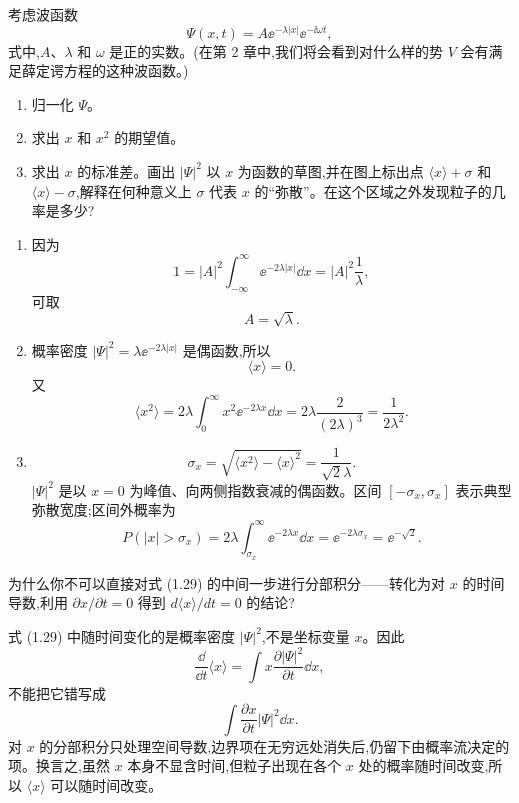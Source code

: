 \begin{question}
考虑波函数
\[
\Psi(x,t)=A \ee^{-\lambda |x|} \ee^{-\ii\omega t},
\]
式中,$A$、$\lambda$ 和 $\omega$ 是正的实数。(在第 2 章中,我们将会看到对什么样的势 $V$ 会有满足薛定谔方程的这种波函数。)
\begin{enumerate}
\item 归一化 $\Psi$。
\item 求出 $x$ 和 $x^2$ 的期望值。
\item 求出 $x$ 的标准差。画出 $|\Psi|^2$ 以 $x$ 为函数的草图,并在图上标出点 $\langle x\rangle+\sigma$ 和 $\langle x\rangle-\sigma$,解释在何种意义上 $\sigma$ 代表 $x$ 的“弥散”。在这个区域之外发现粒子的几率是多少?
\end{enumerate}
\end{question}
\begin{solution}
\begin{enumerate}
\item 因为
\[
1=|A|^2\int_{-\infty}^{\infty}\ee^{-2\lambda |x|}\dd x
=|A|^2\frac{1}{\lambda},
\]
可取
\[
A=\sqrt{\lambda}.
\]
\item 概率密度 $|\Psi|^2=\lambda \ee^{-2\lambda |x|}$ 是偶函数,所以
\[
\langle x\rangle=0.
\]
又
\[
\langle x^2\rangle=2\lambda\int_0^\infty x^2\ee^{-2\lambda x}\dd x
=2\lambda\frac{2}{(2\lambda)^3}=\frac{1}{2\lambda^2}.
\]
\item
\[
\sigma_x=\sqrt{\langle x^2\rangle-\langle x\rangle^2}=\frac{1}{\sqrt2\lambda}.
\]
$|\Psi|^2$ 是以 $x=0$ 为峰值、向两侧指数衰减的偶函数。区间
$[-\sigma_x,\sigma_x]$ 表示典型弥散宽度;区间外概率为
\[
P(|x|>\sigma_x)=2\lambda\int_{\sigma_x}^{\infty}\ee^{-2\lambda x}\dd x
=\ee^{-2\lambda\sigma_x}=\ee^{-\sqrt2}.
\]
\end{enumerate}
\end{solution}

\begin{question}
为什么你不可以直接对式 (1.29) 的中间一步进行分部积分——转化为对 $x$ 的时间导数,利用 $\partial x/\partial t=0$ 得到 $d\langle x\rangle/dt=0$ 的结论?

\par\smallskip
{}

\end{question}
\begin{solution}
式 (1.29) 中随时间变化的是概率密度 $|\Psi|^2$,不是坐标变量 $x$。因此
\[
\frac{\dd}{\dd t}\langle x\rangle
=\int x\frac{\partial |\Psi|^2}{\partial t}\dd x,
\]
不能把它错写成
\[
\int \frac{\partial x}{\partial t}|\Psi|^2\dd x.
\]
对 $x$ 的分部积分只处理空间导数,边界项在无穷远处消失后,仍留下由概率流决定的项。换言之,虽然 $x$ 本身不显含时间,但粒子出现在各个 $x$ 处的概率随时间改变,所以 $\langle x\rangle$ 可以随时间改变。
\end{solution}

